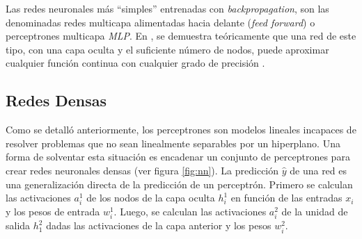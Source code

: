 Las redes neuronales más ``simples'' entrenadas con {\it backpropagation}, son las denominadas redes multicapa
alimentadas hacia delante ({\it feed forward}) o perceptrones multicapa {\it MLP}. En
\citeyear{funahashi1989approximate}, se demuestra teóricamente que una red de este tipo, con una capa oculta y el
suficiente número de nodos, puede aproximar cualquier función continua con cualquier grado de precisión \parencite{funahashi1989approximate}.

\subsection{Redes Densas}
Como se detalló anteriormente, los perceptrones son modelos lineales incapaces de resolver problemas que no sean
linealmente separables por un hiperplano. Una forma de solventar esta situación es encadenar un conjunto de
perceptrones para crear redes neuronales densas (ver figura \ref{fig:nn}). La predicción $\hat{y}$ de una red es una
generalización directa de la predicción de un perceptrón. Primero se calculan las activaciones $a_i^1$ de los nodos de
la capa oculta $h_i^1$ en función de las entradas $x_i$ y los pesos de entrada $w_i^1$. Luego, se calculan las
activaciones $a_i^2$ de la unidad de salida $h_1^2$ dadas las activaciones de la capa anterior y los pesos $w_i^2$.

